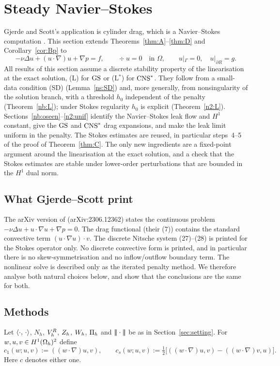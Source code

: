 \section{Steady Navier--Stokes}\label{ns:sec}

Gjerde and Scott's application is cylinder drag, which is a Navier--Stokes computation \cite{GjerdeScott2024}. This section extends Theorems~\ref{thm:A}--\ref{thm:D} and Corollary~\ref{cor:Bp} to
\[
-\nu\Delta u+(u\cdot\nabla)u+\nabla p=f,\qquad \div u=0\quad\text{in }\Omega,\qquad u|_\Gamma=0,\quad u|_{\partial R}=g .
\]
All results of this section assume a discrete stability property of the linearisation at the exact solution, (L) for $\mathrm{GS}$ or (L$^\ast$) for $\mathrm{CNS}^\ast$. They follow from a small-data condition (SD) (Lemma~\ref{ns:SD}) and, more generally, from nonsingularity of the solution branch, with a threshold $h_0$ independent of the penalty (Theorem~\ref{nb:L}); under Stokes regularity $h_0$ is explicit (Theorem~\ref{n2:L}). Sections~\ref{nb:oseen}--\ref{n2:unif} identify the Navier--Stokes leak flow and $H^1$ constant, give the $\mathrm{GS}$ and $\mathrm{CNS}^\ast$ drag expansions, and make the leak limit uniform in the penalty. The Stokes estimates are reused, in particular steps~4--5 of the proof of Theorem~\ref{thm:C}. The only new ingredients are a fixed-point argument around the linearisation at the exact solution, and a check that the Stokes estimates are stable under lower-order perturbations that are bounded in the $H^1$ dual norm.

\subsection{What Gjerde--Scott print}\label{ns:gsprint}
The arXiv version of \cite{GjerdeScott2024} (arXiv:2306.12362) states the continuous problem $-\nu\Delta u+u\cdot\nabla u+\nabla p=0$. The drag functional (their (7)) contains the standard convective term $(u\cdot\nabla u)\cdot v$. The discrete Nitsche system (27)--(28) is printed for the Stokes operator only. No discrete convective form is printed, and in particular there is no skew-symmetrisation and no inflow/outflow boundary term. The nonlinear solve is described only as the iterated penalty method. We therefore analyse both natural choices below, and show that the conclusions are the same for both.

\subsection{Methods}
Let $\langle \cdot,\, \cdot\rangle$, $N_h$, $V_h^R$, $Z_h$, $W_h$, $\Pi_h$ and $|\!|\!|\cdot|\!|\!|$ be as in Section~\ref{sec:setting}. For $w,u,v\in H^1(\Omega_h)^2$ define
\[
c_1(w;u,v):=((w\cdot\nabla)u,v),\qquad
c_s(w;u,v):=\tfrac12\bigl[((w\cdot\nabla)u,v)-((w\cdot\nabla)v,u)\bigr].
\]
Here $c$ denotes either one.

